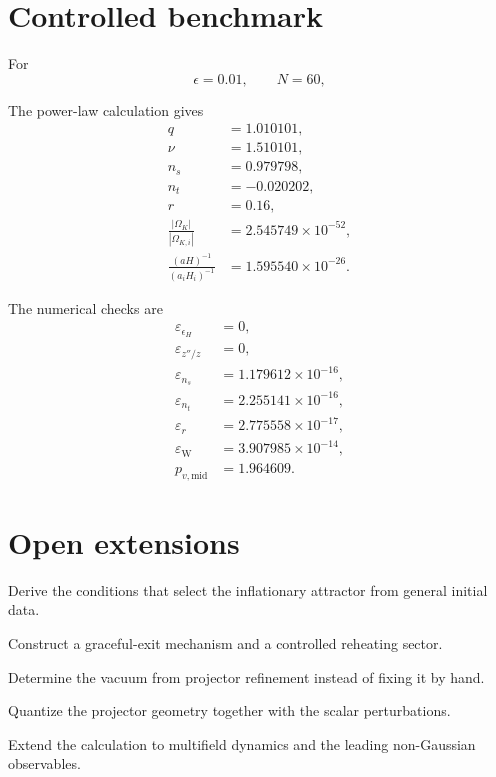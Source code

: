 \section{Controlled benchmark}
For
\begin{equation}
\epsilon=0.01,
\qquad
N=60,
\end{equation}
\par\noindent
\begin{minipage}[t]{.49\linewidth}\small
The power-law calculation gives
\begin{align}
q&=1.010101,\\
\nu&=1.510101,\\
n_s&=0.979798,\\
n_t&=-0.020202,\\
r&=0.16,\\
\frac{|\Omega_K|}{|\Omega_{K,i}|}
&=2.545749\times10^{-52},\\
\frac{(aH)^{-1}}{(a_iH_i)^{-1}}
&=1.595540\times10^{-26}.
\end{align}
\end{minipage}\hfill
\begin{minipage}[t]{.49\linewidth}\small
The numerical checks are
\begin{align}
\varepsilon_{\epsilon_H}&=0,\\
\varepsilon_{z''/z}&=0,\\
\varepsilon_{n_s}&=1.179612\times10^{-16},\\
\varepsilon_{n_t}&=2.255141\times10^{-16},\\
\varepsilon_r&=2.775558\times10^{-17},\\
\varepsilon_{\mathrm W}&=3.907985\times10^{-14},\\
p_{v,\mathrm{mid}}&=1.964609.
\end{align}
\end{minipage}\par


\section{Open extensions}
\begin{nextsteps}
\item Derive the conditions that select the inflationary attractor from general initial data.
\item Construct a graceful-exit mechanism and a controlled reheating sector.
\item Determine the vacuum from projector refinement instead of fixing it by hand.
\item Quantize the projector geometry together with the scalar perturbations.
\item Extend the calculation to multifield dynamics and the leading non-Gaussian observables.
\end{nextsteps}
